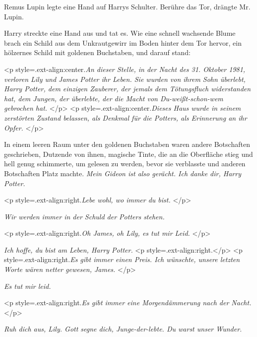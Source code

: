 Remus Lupin legte eine Hand auf Harrys Schulter. \glqq Berühre das Tor\grqq{},
drängte Mr. Lupin.

Harry streckte eine Hand aus und tat es. Wie eine schnell wachsende Blume brach
ein Schild aus dem Unkrautgewirr im Boden hinter dem Tor hervor, ein hölzernes
Schild mit goldenen Buchstaben, und darauf stand:

<p style=\grqq{}.ext-align:center\grqq{}.\emph{An dieser Stelle, in der Nacht
des 31. Oktober 1981, verloren Lily und James Potter ihr Leben. Sie wurden von
ihrem Sohn überlebt, Harry Potter, dem einzigen Zauberer, der jemals dem
Tötungsfluch widerstanden hat, dem Jungen, der überlebte, der die Macht von
Du-weißt-schon-wem gebrochen hat. }</p> <p
style=\grqq{}.ext-align:center\grqq{}.\emph{Dieses Haus wurde in seinem
zerstörten Zustand belassen, als Denkmal für die Potters, als Erinnerung an ihr
Opfer. }</p>

In einem leeren Raum unter den goldenen Buchstaben waren andere Botschaften
geschrieben, Dutzende von ihnen, magische Tinte, die an die Oberfläche stieg und
hell genug schimmerte, um gelesen zu werden, bevor sie verblasste und anderen
Botschaften Platz machte.
\emph{Mein Gideon ist also gerächt. Ich danke dir, Harry Potter. }

<p style=\grqq{}.ext-align:right\grqq{}.\emph{Lebe wohl, wo immer du bist. }</p>

\emph{Wir werden immer in der Schuld der Potters stehen. }

<p style=\grqq{}.ext-align:right\grqq{}.\emph{Oh James, oh Lily, es tut mir
Leid. }</p>

\emph{Ich hoffe, du bist am Leben, Harry Potter. }
<p style=\grqq{}.ext-align:right\grqq{}.</p> <p
style=\grqq{}.ext-align:right\grqq{}.\emph{Es gibt immer einen Preis. Ich
wünschte, unsere letzten Worte wären netter gewesen, James. }</p>

\emph{Es tut mir leid. }

<p style=\grqq{}.ext-align:right\grqq{}.\emph{Es gibt immer eine Morgendämmerung
nach der Nacht. }</p>

\emph{Ruh dich aus, Lily. Gott segne dich, Junge-der-lebte. Du warst unser Wunder. }

